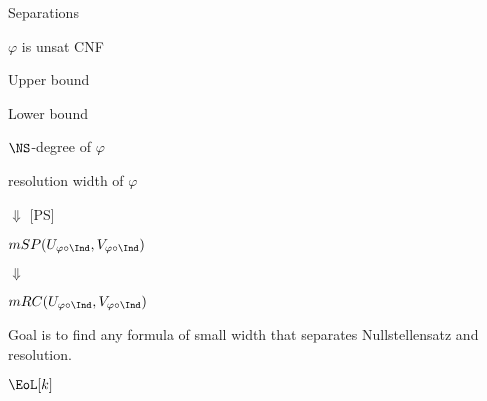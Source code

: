 \begin{frame}{Separations}

    \begin{center}
        $\varphi$ is unsat CNF
	\end{center}

    \begin{minipage}{0.5 \textwidth}
        \centering
        Upper bound
    \end{minipage}%
    \begin{minipage}{0.5 \textwidth}
        \centering
        Lower bound
    \end{minipage}

    \pause
    \vspace{0.4cm}

    \begin{minipage}{0.5 \textwidth}
        \centering
        $\NS$-degree of $\varphi$
    \end{minipage}%
    \begin{minipage}{0.5 \textwidth}
        \centering
        resolution width of $\varphi$
    \end{minipage}

    \pause
    \vspace{0.3cm}

    \begin{minipage}{0.5 \textwidth}
        \centering
        $\Downarrow$ [PS]

        \vspace{0.3cm}

        $mSP(U_{\varphi \circ \Ind}, V_{\varphi \circ \Ind})$
    \end{minipage}%
    \begin{minipage}{0.5 \textwidth}
        \centering
        $\Downarrow$

        \vspace{0.3cm}
        
        $mRC(U_{\varphi \circ \Ind}, V_{\varphi \circ \Ind})$
    \end{minipage}


    \pause
    \vspace{1cm}
    Goal is to find any formula of small width that separates Nullstellensatz and resolution.

\end{frame}


\begin{frame}{$\EoL[k]$}
    
\end{frame}